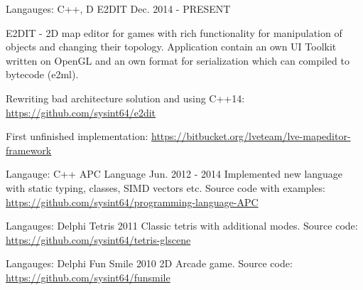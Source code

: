 \begin{cventries}
\cventry
{Langauges: C++, D} %
{E2DIT} %
{} %
{Dec. 2014 - PRESENT} %
{ %
E2DIT - 2D map editor for games with rich functionality for manipulation of objects and changing their topology. \linebreak
Application contain an own UI Toolkit written on OpenGL and an own format for serialization which can compiled to bytecode (e2ml). \linebreak
\linebreak
\begin{cvitems}
    \item {Rewriting bad architecture solution and using C++14: \url{https://github.com/sysint64/e2dit}}
    \item {First unfinished implementation: \url{https://bitbucket.org/lveteam/lve-mapeditor-framework}}
\end{cvitems}
}

\cventry
{Langauge: C++} %
{APC Language} %
{} %
{Jun. 2012 - 2014} %
{ %
Implemented new language with static typing, classes, SIMD vectors etc. \linebreak
Source code with examples: \url{https://github.com/sysint64/programming-language-APC}
}


\cventry
{Langauges: Delphi} %
{Tetris} %
{} %
{2011} %
{ %
Classic tetris with additional modes. Source code: \url{https://github.com/sysint64/tetris-glscene}
}

\cventry
{Langauges: Delphi} %
{Fun Smile} %
{} %
{2010} %
{ %
2D Arcade game. Source code: \url{https://github.com/sysint64/funsmile}
}


\end{cventries}
